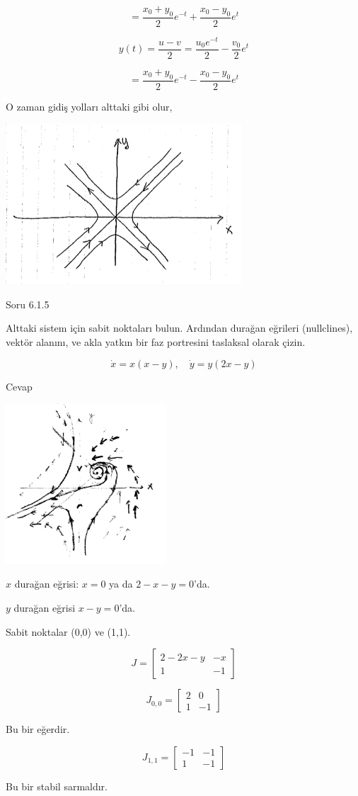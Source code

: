 \documentclass[12pt,fleqn]{article}\usepackage{../../common}
\begin{document}
$$ = \frac{x_0+y_0}{2} e^{-t} +  \frac{x_0-y_0}{2} e^{t} $$

$$ y(t) = \frac{u-v}{2} = \frac{u_0 e^{-t}}{2} - \frac{v_0}{2} e^{t} $$

$$ = \frac{x_0+y_0}{2} e^{-t} - \frac{x_0-y_0}{2} e^{t}  $$

O zaman gidiş yolları alttaki gibi olur,

\includegraphics[height=6cm]{12_06.png}

Soru 6.1.5

Alttaki sistem için sabit noktaları bulun. Ardından durağan eğrileri
(nullclines), vektör alanını, ve akla yatkın bir faz portresini taslaksal olarak
çizin.

$$ \dot{x} = x(x-y), \quad \dot{y} = y(2x-y) $$

Cevap

\includegraphics[height=6cm]{12_07.png}

$x$ durağan eğrisi: $x=0$ ya da $2-x-y=0$'da.

$y$ durağan eğrisi $x-y=0$'da.

Sabit noktalar (0,0) ve (1,1).

$$ J = \left[\begin{array}{rr}
2-2x-y & -x \\ 1 & -1
\end{array}\right] $$

$$ J_{0,0} = \left[\begin{array}{rr}
2 & 0 \\ 1 & -1
\end{array}\right] $$

Bu bir eğerdir.

$$ J_{1,1} = \left[\begin{array}{rr}
-1 & -1 \\ 1 & -1
\end{array}\right] $$

Bu bir stabil sarmaldır. 
\end{document}
